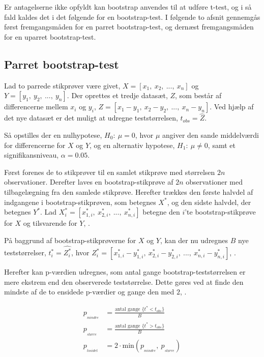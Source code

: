 \documentclass[
]{book}
\theoremstyle{definition}
\theoremstyle{definition}
\theoremstyle{definition}
\theoremstyle{remark}
\begin{document}
Er antagelserne ikke opfyldt kan bootstrap anvendes til at udføre t-test, og i så fald kaldes det i det følgende for en bootstrap-test. I følgende to afsnit gennemgås først fremgangsmåden for en parret bootstrap-test, og dernæst fremgangsmåden for en uparret bootstrap-test.

\hypertarget{parret-bootstrap-test}{%
\subsection{Parret bootstrap-test}\label{parret-bootstrap-test}}

Lad to parrede stikprøver være givet, \(X=[x_{1},~x_{2},~...,~x_{n}]\) og \(Y=[y_{1},~y_{2},~...,~y_{n}]\).
Der oprettes et tredje datasæt, \(Z\), som består af differencerne mellem \(x_i\) og \(y_i\), \(Z = [x_1-y_1,~ x_2-y_2,~...,~x_n-y_n]\). Ved hjælp af det nye datasæt er det muligt at udregne teststørrelsen, \(t_{obs}=\hat{Z}\).

Så opstilles der en nulhypotese, \(H_0:~\mu = 0\), hvor \(\mu\) angiver den sande middelværdi for differencerne for \(X\) og \(Y\), og en alternativ hypotese, \(H_1:~\mu\neq 0\), samt et signifikansniveau, \(\alpha = 0.05\).

Først forenes de to stikprøver til en samlet stikprøve med størrelsen \(2n\) observationer. Derefter laves en bootstrap-stikprøve af \(2n\) observationer med tilbagelægning fra den samlede stikprøve. Herefter trækkes den første halvdel af indgangene i bootstrap-stikprøven, som betegnes \(X^*\), og den sidste halvdel, der betegnes \(Y^*\). Lad \(X^*_i = [x^*_{1,i},~x^*_{2,i},~...,~x^*_{n,i}]\) betegne den \(i\)'te bootstrap-stikprøve for \(X\) og tilsvarende for \(Y\), \citep[slide 2]{Paired_test}.

På baggrund af bootstrap-stikprøverne for \(X\) og \(Y\), kan der nu udregnes \(B\) nye teststørrelser, \(t^*_i = \hat{Z^*_i}\), hvor \(Z^*_i = [x^*_{1,i}-y^*_{1,i},~x^*_{2,i}-y^*_{2,i},~...,~x^*_{n,i}-y^*_{n,i}]\), \citep{Paired_test}.

Herefter kan p-værdien udregnes, som antal gange bootstrap-teststørrelsen er mere ekstrem end den observerede teststørrelse. Dette gøres ved at finde den mindste af de to ensidede p-værdier og gange den med \(2\), \citep{Hypo_test}.

\begin{align}
p_{_{mindre}} &= \frac{\text{antal gange }\{t^*<t_{obs}\}}{B} \\
p_{_{større}} &= \frac{\text{antal gange }\{t^*>t_{obs}\}}{B} \\
p_{_{tosidet}} &= 2 \cdot \text{min}(p_{_{mindre}},~p_{_{større}})
\end{align}
\end{document}
